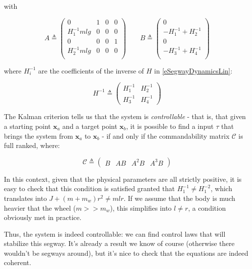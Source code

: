 \documentclass[a4paper,11pt]{article}
\begin{document}
with

\begin{equation}
	A \triangleq \begin{pmatrix}
	0     & 1     & 0     & 0 \\
	H^{-1}_1 mlg   & 0     & 0     & 0 \\
	0    & 0     & 0     & 1 \\
	H^{-1}_2 mlg    & 0     & 0     & 0 \\
	\end{pmatrix} \qquad 
	B \triangleq \begin{pmatrix}
	0     \\
	- H^{-1}_1 + H^{-1}_2 \\
	0 \\
	-H^{-1}_3 + H^{-1}_4 \\
	\end{pmatrix}
\end{equation}

where $H^{-1}_i$ are the coefficients of the inverse of $H$ in \eqref{eSegwayDynamicsLin}: 

\begin{equation}
H^{-1} \triangleq \begin{pmatrix} H^{-1}_1 & H^{-1}_2 \\
H^{-1}_3 & H^{-1}_4
\end{pmatrix}
\end{equation}

The Kalman criterion tells us that the system is \emph{controllable} - that is, that given a starting point $\bm x_a$ and a target point $\bm x_b$, it is possible to find a input $\tau$ that brings the system from $\bm x_a$ to $\bm x_b$ - if and only if the commandability matrix $\mathcal{C}$ is full ranked, where:

\begin{equation}
	\mathcal{C} \triangleq \begin{pmatrix} B & AB & A^2 B & A^3 B\end{pmatrix}
\end{equation}

In this context, given that the physical parameters are all strictly positive, it is easy to check that this condition is satisfied granted that $H^{-1}_1 \neq H^{-2}_1$, which translates into $J + (m + m_w) r^2 \neq m l r$. If we assume that the body is much heavier that the wheel ($m >> m_w$), this simplifies into $l \neq r$, a condition obviously met in practice.

Thus, the system is indeed controllable: we can find control laws that will stabilize this segway. It's already a result we know of course (otherwise there wouldn't be segways around), but it's nice to check that the equations are indeed coherent.
\end{document}
